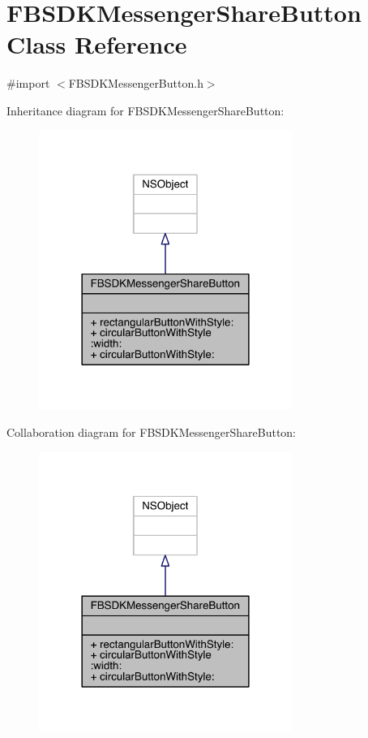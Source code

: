 \hypertarget{interface_f_b_s_d_k_messenger_share_button}{\section{F\-B\-S\-D\-K\-Messenger\-Share\-Button Class Reference}
\label{interface_f_b_s_d_k_messenger_share_button}
}


{\ttfamily \#import $<$F\-B\-S\-D\-K\-Messenger\-Button.\-h$>$}



Inheritance diagram for F\-B\-S\-D\-K\-Messenger\-Share\-Button\-:
\nopagebreak
\begin{figure}[H]
\begin{center}
\leavevmode
\includegraphics[width=234pt]{interface_f_b_s_d_k_messenger_share_button__inherit__graph}
\end{center}
\end{figure}


Collaboration diagram for F\-B\-S\-D\-K\-Messenger\-Share\-Button\-:
\nopagebreak
\begin{figure}[H]
\begin{center}
\leavevmode
\includegraphics[width=234pt]{interface_f_b_s_d_k_messenger_share_button__coll__graph}
\end{center}
\end{figure}
